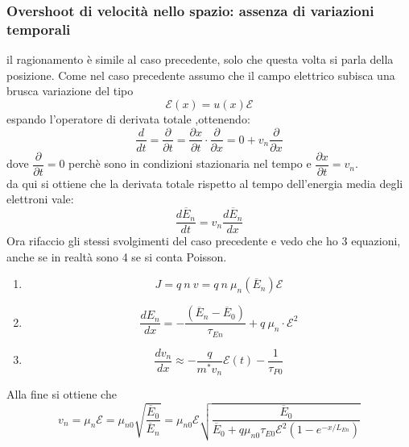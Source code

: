 \subsubsection{Overshoot di velocità nello spazio: assenza di variazioni temporali}
il ragionamento è simile al caso precedente, solo che questa volta si parla della posizione.
Come nel caso precedente assumo che il campo elettrico subisca una brusca variazione del tipo
%
\begin{equation}
    \mathcal{E}(x)=u(x)\mathcal{E}
\end{equation}
%
espando l'operatore di derivata totale ,ottenendo:
%
\begin{equation}
    \dfrac{d}{dt} = \dfrac{\partial}{\partial t} = \dfrac{\partial x}{\partial t} \cdot \dfrac{\partial}{\partial x} = 0 + v_n \dfrac{\partial}{\partial x}
\end{equation}
%
dove $\dfrac{\partial}{\partial t} =0 $ perchè sono in condizioni stazionaria nel tempo e $\dfrac{\partial x}{\partial t} =v_n$.\\
da qui si ottiene che la derivata totale rispetto al tempo dell’energia media degli elettroni vale:
%
\begin{equation}
    \dfrac{d \overline{E}_n}{dt}=v_n \dfrac{d \overline{E}_n}{dx}
\end{equation}
%
Ora rifaccio gli stessi svolgimenti del caso precedente e vedo che ho 3 equazioni, anche se in realtà sono 4 se si conta Poisson.
\begin{enumerate}
    \item \begin{equation}
            J=q\ n\ v =q\ n\ \mu_n(\overline{E}_n)\mathcal{E}
          \end{equation}
    \item \begin{equation}
            \dfrac{dE_n}{dx}=-\dfrac{(\overline{E}_n-\overline{E}_0)}{\tau_{En}}+q\ \mu_n \cdot \mathcal{E}^2 
          \end{equation}
    \item \begin{equation}
            \dfrac{dv_n}{dx} \approx -\dfrac{q}{m^*v_n}\mathcal{E}(t)-\dfrac{1}{\tau_{P0}}
          \end{equation}
\end{enumerate}
Alla fine si ottiene che 
\begin{equation}
    v_n=\mu_{n}\mathcal{E}=\mu_{n0}\sqrt{\dfrac{\overline{E}_0}{\overline{E}_n}}=\mu_{n0}\mathcal{E}\sqrt{\dfrac{\overline{E}_0}{\overline{E}_0+q \mu_{n0} \tau_{E0} \mathcal{E}^2(1-e^{-x/L_{En}})}} 
\end{equation}
